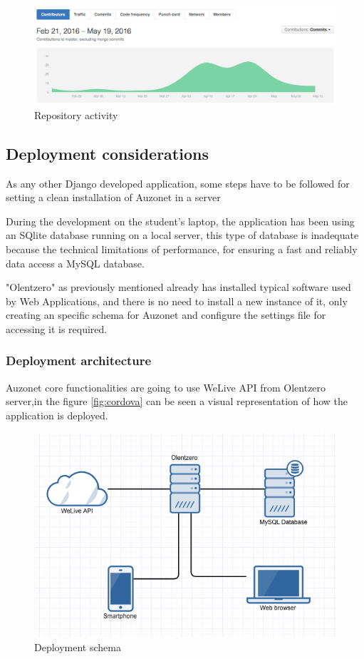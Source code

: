 \documentclass{DeustoFDP}
\begin{document}
\begin{figure}[h!]
\centering
\includegraphics[width=0.8\linewidth]{fig/githubactivity}
\caption[Repository activity]{Repository activity}
\label{fig:githubactivity}
\end{figure}

\subsection{Deployment considerations}
As any other Django developed application, some steps have to be followed for setting a clean installation of Auzonet in a server

During the development on the student's laptop, the application has been using an SQlite database running on a local server, this type of database is inadequate because the technical limitations of performance, for ensuring a fast and reliably data access a MySQL database. 

"Olentzero" as previously mentioned already has installed typical software used by Web Applications, and there is no need to install a new instance of it, only creating an specific schema for Auzonet and configure the settings file for accessing it is required. 


\subsubsection{Deployment architecture}
Auzonet core functionalities are going to use WeLive API from Olentzero server,in the figure \ref{fig:cordova} can be seen a visual representation of how the application is deployed.

\begin{figure}[h!]
\centering
\includegraphics[width=0.7\linewidth]{fig/deployment}
\caption[Deployment schema]{Deployment schema}
\label{fig:deployment}
\end{figure}
\end{document}
